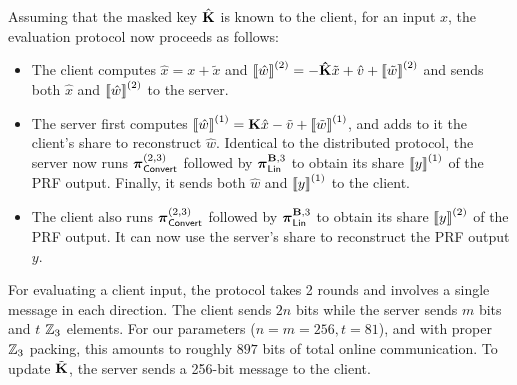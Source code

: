 \noindent Assuming that the masked key $\hat{\mat{K}}$ is known to the client, for an input $x$,  the evaluation protocol now proceeds as follows:
\begin{itemize}
  \item The client computes $\hat{x} = x + \tilde{x}$ and $\share{\hat{w}}^{(2)} = -\mat{\hat{K}}\tilde{x} + \hat{v} + \share{\tilde{w}}^{(2)}$ and sends both $\hat{x}$ and $\left\llbracket \hat{w} \right\rrbracket^{(2)}$ to the server.

  \item The server first computes $\share{\hat{w}}^{(1)} = \mat{K}\hat{x} - \tilde{v} + \share{\tilde{w}}^{(1)}$, and adds to it the client's share to reconstruct $\hat{w}$. Identical to the distributed protocol, the server now runs $\boldsymbol{\pi}_{\textsf{Convert}}^{(2,3)}$ followed by $\prot_\LMap^{\mat{B},3}$ to obtain its share $\left\llbracket y \right\rrbracket^{(1)}$ of the PRF output. Finally, it sends both $\hat{w}$ and $\left\llbracket y \right\rrbracket^{(1)}$ to the client.

  \item The client also runs $\boldsymbol{\pi}_{\textsf{Convert}}^{(2,3)}$ followed by $\prot_\LMap^{\mat{B},3}$ to obtain its share $\left\llbracket y \right\rrbracket^{(2)}$ of the PRF output. It can now use the server's share to reconstruct the PRF output $y$.


\end{itemize}
For evaluating a client input, the protocol takes 2 rounds and involves a single message in each direction. The client sends $2n$ bits while the server sends $m$ bits and $t$ $\mathbb{Z}_3$ elements. For our parameters ($n=m=256, t=81$), and with proper $\mathbb{Z}_3$ packing, this amounts to roughly $897$ bits of total online communication. To update $\tilde{\mat{K}}$, the server sends a 256-bit message to the client.


